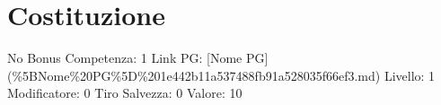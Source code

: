 \section{Costituzione}\label{costituzione}

\begin{description}
\tightlist
\item[Tags: STAT]
No Bonus Competenza: 1 Link PG: {[}Nome PG{]}
(\%5BNome\%20PG\%5D\%201e442b11a537488fb91a528035f66ef3.md) Livello: 1
Modificatore: 0 Tiro Salvezza: 0 Valore: 10
\end{description}
